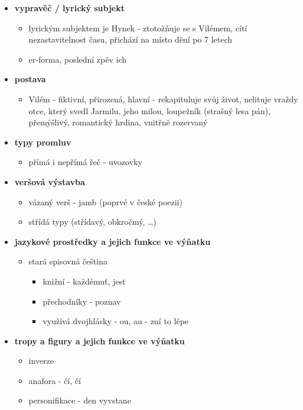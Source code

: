 \documentclass[11pt]{article}
\begin{document}
\begin{itemize}
\begin{itemize}
        \end{itemize}
        \item\textbf{vypravěč / lyrický subjekt}
        \begin{itemize}
            \item lyrickým subjektem je Hynek - ztotožňuje se s Vilémem, cítí nezastavitelnost času, přichází na místo dění po 7 letech
            \item er-forma, poslední zpěv ich
        \end{itemize}
        \item\textbf{postava}
        \begin{itemize}
            \item Vilém - fiktivní, přirozená, hlavní - rekapituluje svůj život, nelituje vraždy otce, který svedl Jarmilu, jeho milou, loupežník (strašný lesa pán), přemýšlivý, romantický hrdina, vnitřně rozervaný
        \end{itemize}
        \item\textbf{typy promluv}
        \begin{itemize}
            \item přímá i nepřímá řeč - uvozovky
        \end{itemize}
        \item\textbf{veršová výstavba}
        \begin{itemize}
            \item vázaný verš - jamb (poprvé v české poezii)
            \item střídá typy (střídavý, obkročmý, \dots)
        \end{itemize}
        \item\textbf{jazykové prostředky a jejich funkce ve výňatku}
        \begin{itemize}
            \item stará spisovná čeština
            \begin{itemize}
                \item knižní - každémuť, jest
                \item přechodníky - poznav
                \item využívá dvojhlásky - ou, au - zní to lépe
            \end{itemize}
        \end{itemize}
        \item\textbf{tropy a figury a jejich funkce ve výňatku}
        \begin{itemize}
            \item inverze
            \item anafora - čí, čí
            \item personifikace - den vyvstane
        \end{itemize}
    \end{itemize}
\end{document}
